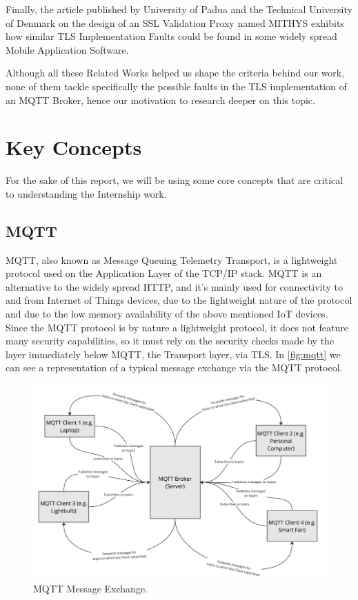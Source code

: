 \documentclass[binding=0.6cm,noexaminfo]{sapthesis}
\begin{document}
Finally, the article published by University of Padua and the Technical University of Denmark on the design of an SSL Validation Proxy named MITHYS \cite{mithys} exhibits how similar TLS Implementation Faults could be found in some widely spread Mobile Application Software.

Although all these Related Works helped us shape the criteria behind our work, none of them tackle specifically the possible faults in the TLS implementation of an MQTT Broker, hence our motivation to research deeper on this topic.

\section{Key Concepts}
For the sake of this report, we will be using some core concepts that are critical to understanding the Internship work.

\subsection{MQTT}
MQTT, also known as Message Queuing Telemetry Transport, is a lightweight protocol used on the Application Layer of the TCP/IP stack. MQTT is an alternative to the widely spread HTTP, and it’s mainly used for connectivity to and from Internet of Things devices, due to the lightweight nature of the protocol and due to the low memory availability of the above mentioned IoT devices.
Since the MQTT protocol is by nature a lightweight protocol, it does not feature many security capabilities, so it must rely on the security checks made by the layer immediately below MQTT, the Transport layer, via TLS.
In \autoref{fig:mqtt} we can see a representation of a typical message exchange via the MQTT protocol.

\begin{figure}[htb]
	\includegraphics[width=14cm]{MQTT}
	\caption{MQTT Message Exchange.}
	\label{fig:mqtt}
\end{figure}
\end{document}
